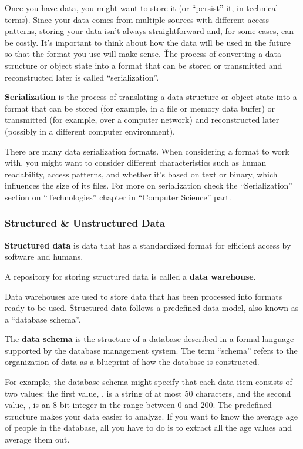 Once you have data, you might want to store it (or ``persist'' it, in technical terms). Since your data comes from
multiple sources with different access patterns, storing your data isn't always straightforward and, for some cases,
can be costly. It's important to think about how the data will be used in the future so that the format you use
will make sense. \v

The process of converting a data structure or object state into a format that can be stored or transmitted and
reconstructed later is called ``serialization''.

\bd[Serialization]
\textbf{Serialization} is the process of translating a data structure or object state into a format that can be stored
(for example, in a file or memory data buffer) or transmitted (for example, over a computer network) and reconstructed
later (possibly in a different computer environment).
\ed

There are many data serialization formats. When considering a format to work with, you might want to consider
different characteristics such as human readability, access patterns, and whether it's based on text or binary, which
influences the size of its files. For more on serialization check the ``Serialization'' section on ``Technologies''
chapter in ``Computer Science'' part.

\subsubsection{Structured \& Unstructured Data}

\textbf{Structured data} is data that has a standardized format for efficient access by software and humans.
\ed

A repository for storing structured data is called a \textbf{data warehouse}.
\ed

Data warehouses are used to store data that has been processed into formats ready to be used. \v

Structured data follows a predefined data model, also known as a ``database schema''.

The \textbf{data schema} is the structure of a database described in a formal language supported by the database
management system. The term ``schema'' refers to the organization of data as a blueprint of how the database is
constructed.
\ed

\be
For example, the database schema might specify that each data item consists of two values: the first value, ,
is a string of at most 50 characters, and the second value, , is an 8-bit integer in the range between 0 and
200. The predefined structure makes your data easier to analyze. If you want to know the average age of people in the
database, all you have to do is to extract all the age values and average them out.
\ee

